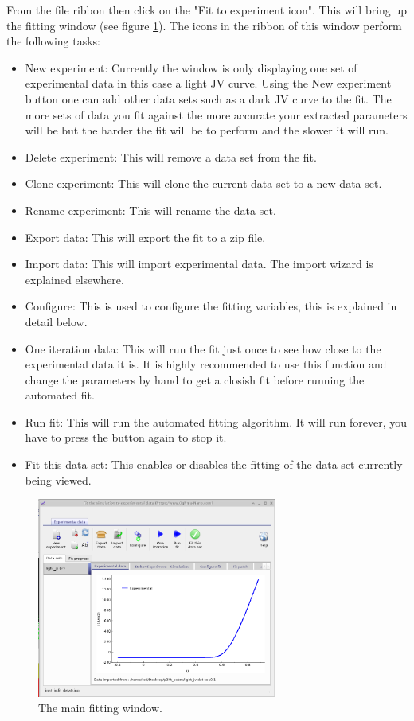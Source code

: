 From the file ribbon then click on the "Fit to experiment icon". This will bring up the fitting window (see figure \ref{fig:fit_window_first_open}).  The icons in the ribbon of this window perform the following tasks:

\begin{itemize}
  \item New experiment: Currently the window is only displaying one set of experimental data in this case a light JV curve. Using the New experiment button one can add other data sets such as a dark JV curve to the fit. The more sets of data you fit against the more accurate your extracted parameters will be but the harder the fit will be to perform and the slower it will run.
  \item Delete experiment: This will remove a data set from the fit.
  \item Clone experiment: This will clone the current data set to a new data set.
  \item Rename experiment: This will rename the data set.
  \item Export data: This will export the fit to a zip file.
  \item Import data: This will import experimental data. The import wizard is explained elsewhere.
  \item Configure: This is used to configure the fitting variables, this is explained in detail below.
  \item One iteration data: This will run the fit just once to see how close to the experimental data it is. It is highly recommended to use this function and change the parameters by hand to get a closish fit before running the automated fit.
  \item Run fit: This will run the automated fitting algorithm. It will run forever, you have to press the button again to stop it.
  \item Fit this data set: This enables or disables the fitting of the data set currently being viewed.
\end{itemize}


\begin{figure}[H]
\centering
\includegraphics[width=0.7\textwidth]{./images/fit/fit_window_first_open.png}
\caption{The main fitting window.}
\label{fig:fit_window_first_open}
\end{figure}

